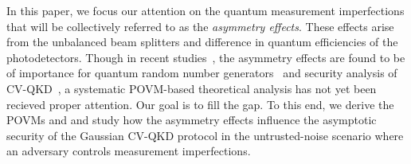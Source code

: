 \documentclass[%
reprint,
superscriptaddress,
 amsmath,amssymb,amsfonts,
 aps,
 pra,
 longbibliography
]{revtex4-2}
\begin{document}


In this paper, we focus our attention
on the quantum measurement imperfections
that will be collectively referred to as the \textit{asymmetry effects}.
These effects arise from the unbalanced beam splitters
and difference in quantum efficiencies of the photodetectors.
Though in recent studies~\cite{Barchielli:pra:2022,Ruiz:heliyon:2023,Bartlett:25}, the asymmetry effects
are found to be of importance for quantum random number
generators~\cite{Barchielli:pra:2022}
and security analysis of CV-QKD~\cite{Ruiz:heliyon:2023,Bartlett:25},
a systematic POVM-based theoretical analysis has not yet been recieved proper attention.
Our goal is to fill the gap.
To this end, we derive the POVMs and
and study how the asymmetry effects influence
the asymptotic security
of the Gaussian CV-QKD protocol
in the untrusted-noise
scenario where an adversary controls measurement
imperfections.
\end{document}
